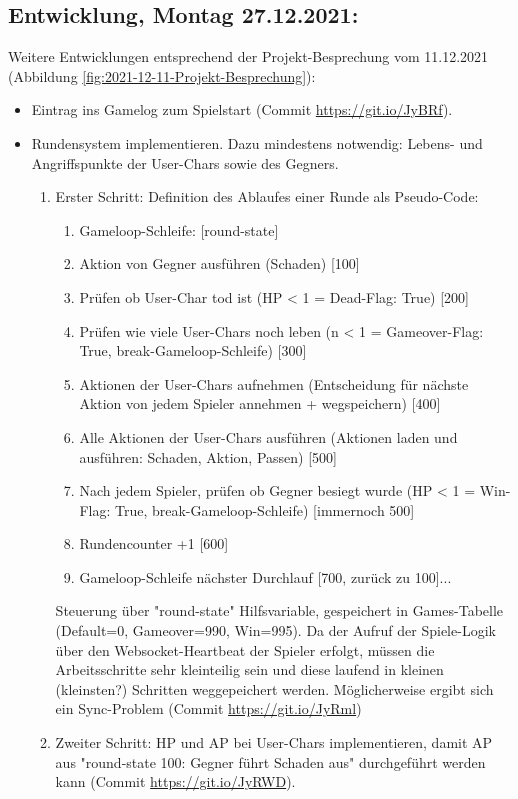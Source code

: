 \subsection{Entwicklung, Montag 27.12.2021:} \label{ref-runden-impl}

Weitere Entwicklungen entsprechend der Projekt-Besprechung vom 11.12.2021 (Abbildung \ref{fig:2021-12-11-Projekt-Besprechung}):

\begin{itemize}
    \item Eintrag ins Gamelog zum Spielstart (Commit \url{https://git.io/JyBRf}).
    \item Rundensystem implementieren. Dazu mindestens notwendig: Lebens- und Angriffspunkte der User-Chars sowie des Gegners. 
    \begin{enumerate}
        \item Erster Schritt: Definition des Ablaufes einer Runde als Pseudo-Code: 
            \begin{enumerate}
                \item Gameloop-Schleife: [round-state]
                \item Aktion von Gegner ausführen (Schaden) [100]
                \item Prüfen ob User-Char tod ist (HP < 1 = Dead-Flag: True) [200]
                \item Prüfen wie viele User-Chars noch leben (n < 1 = Gameover-Flag: True, break-Gameloop-Schleife) [300]
                \item Aktionen der User-Chars aufnehmen (Entscheidung für nächste Aktion von jedem Spieler annehmen + wegspeichern) [400]
                \item Alle Aktionen der User-Chars ausführen (Aktionen laden und ausführen: Schaden, Aktion, Passen) [500]
                \item Nach jedem Spieler, prüfen ob Gegner besiegt wurde (HP < 1 = Win-Flag: True, break-Gameloop-Schleife) [immernoch 500]
                \item Rundencounter +1 [600]
                \item Gameloop-Schleife nächster Durchlauf [700, zurück zu 100]...
            \end{enumerate}
    Steuerung über "round-state" Hilfsvariable, gespeichert in Games-Tabelle (Default=0, Gameover=990, Win=995). Da der Aufruf der Spiele-Logik über den Websocket-Heartbeat der Spieler erfolgt, müssen die Arbeitsschritte sehr kleinteilig sein und diese laufend in kleinen (kleinsten?) Schritten weggepeichert werden. Möglicherweise ergibt sich ein Sync-Problem (Commit \url{https://git.io/JyRml})
    \item Zweiter Schritt: HP und AP bei User-Chars implementieren, damit AP aus "round-state 100: Gegner führt Schaden aus" durchgeführt werden kann (Commit \url{https://git.io/JyRWD}).  
    \end{enumerate}
\end{itemize}


